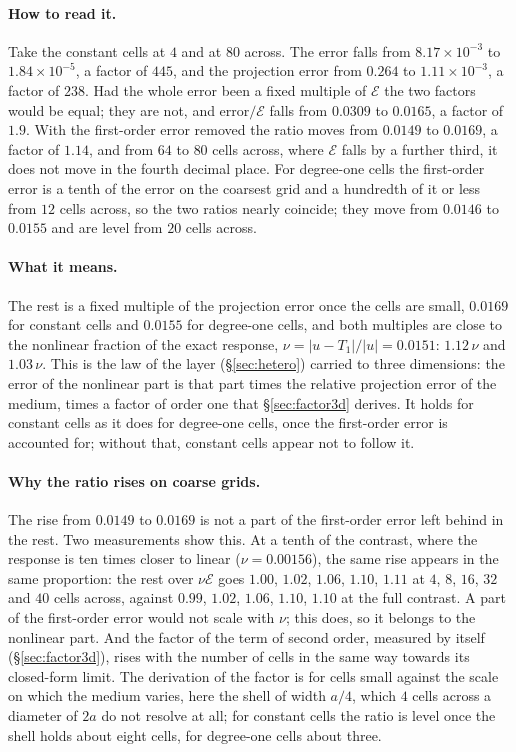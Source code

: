 \documentclass[11pt,a4paper]{article}
\newcommand{\cE}{\mathcal{E}}
\begin{document}
\paragraph{How to read it.} Take the constant cells at $4$ and at $80$ across. The error falls from
$8.17\times10^{-3}$ to $1.84\times10^{-5}$, a factor of $445$, and the projection error from $0.264$ to
$1.11\times10^{-3}$, a factor of $238$. Had the whole error been a fixed multiple of $\cE$ the two factors
would be equal; they are not, and error$/\cE$ falls from $0.0309$ to $0.0165$, a factor of $1.9$. With
the first-order error removed the ratio moves from $0.0149$ to $0.0169$, a factor of $1.14$, and from
$64$ to $80$ cells across, where $\cE$ falls by a further third, it does not move in the fourth decimal
place. For degree-one cells the first-order error is a tenth of the error on the coarsest grid and a
hundredth of it or less from $12$ cells across, so the two ratios nearly coincide; they move from $0.0146$
to $0.0155$ and are level from $20$ cells across.

\paragraph{What it means.} The rest is a fixed multiple of the projection error once the cells are small,
$0.0169$ for constant cells and $0.0155$ for degree-one cells, and both multiples are close to the
nonlinear fraction of the exact response, $\nu=\lvert u-T_1\rvert/\lvert u\rvert=0.0151$: $1.12\,\nu$ and
$1.03\,\nu$. This is the law of the layer (\S\ref{sec:hetero}) carried to three dimensions: the error of
the nonlinear part is that part times the relative projection error of the medium, times a factor of
order one that \S\ref{sec:factor3d} derives. It holds for constant cells as it does for degree-one cells,
once the first-order error is accounted for; without that, constant cells appear not to follow it.

\paragraph{Why the ratio rises on coarse grids.} The rise from $0.0149$ to $0.0169$ is not a part of the
first-order error left behind in the rest. Two measurements show this. At a tenth of the contrast, where
the response is ten times closer to linear ($\nu=0.00156$), the same rise appears in the same proportion:
the rest over $\nu\cE$ goes $1.00$, $1.02$, $1.06$, $1.10$, $1.11$ at $4$, $8$, $16$, $32$ and $40$ cells
across, against $0.99$, $1.02$, $1.06$, $1.10$, $1.10$ at the full contrast. A part of the first-order
error would not scale with $\nu$; this does, so it belongs to the nonlinear part. And the factor of the
term of second order, measured by itself (\S\ref{sec:factor3d}), rises with the number of cells in the
same way towards its closed-form limit. The derivation of the factor is for cells small against the scale
on which the medium varies, here the shell of width $a/4$, which $4$ cells across a diameter of $2a$ do
not resolve at all; for constant cells the ratio is level once the shell holds about eight cells, for
degree-one cells about three.
\end{document}
